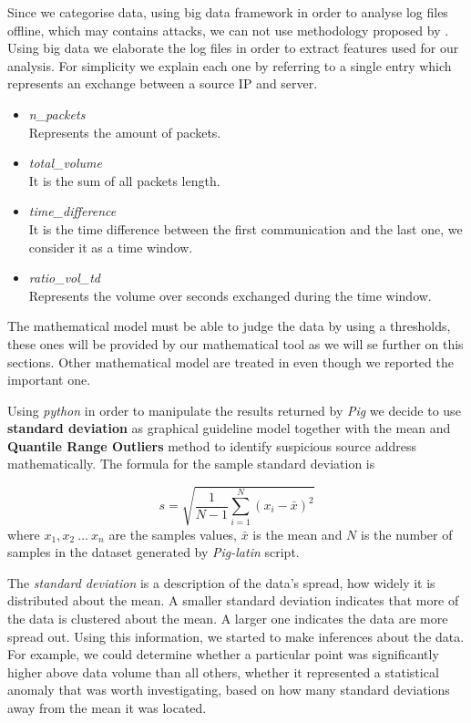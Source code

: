 Since we categorise data, using big data framework in order to analyse log files offline, which may contains attacks, we can not use methodology proposed by \cite{detection_by_path_analaysis}. Using big data we elaborate the log files in order to extract features used for our analysis. For simplicity we explain each one by referring to a single entry which represents an exchange between a source IP and server.

\begin{itemize}
	\item \textit{n\_packets} \\ Represents the amount of packets.
	\item \textit{total\_volume} \\ It is the sum of all packets length.
	\item \textit{time\_difference} \\ It is the time difference between the first communication and the last one, we consider it as a time window.
	\item \textit{ratio\_vol\_td} \\ Represents the volume over seconds exchanged during the time window.
\end{itemize}

The mathematical model must be able to judge the data by using a thresholds, these ones will be provided by our mathematical tool as we will se further on this sections. Other mathematical model are treated in  \cite{detection_by_path_analaysis} even though we reported the important one. 

Using \textit{python} in order to manipulate the results returned by \textit{Pig} we decide to use \textbf{standard deviation} as graphical guideline model together with the mean and  \textbf{Quantile Range Outliers} method to identify suspicious source address mathematically.
The formula for the sample standard deviation is

\begin{equation}
\label{eq:standard_dev}
	s = \sqrt{\frac{1}{N-1}\sum_{i=1}^N(x_i - \bar{x})^2}
\end{equation}
where $x_1, x_2\ ...\ x_n$ are the samples values, $\bar{x}$ is the mean and $N$ is the number of samples in the dataset generated by \textit{Pig-latin} script.

The \textit{standard deviation} is a description of the data's spread, how widely it is distributed about the mean.  
A smaller standard deviation indicates that more of the data is clustered about the mean.  
A larger one indicates the data are more spread out.
Using this information, we started to make inferences about the data.  
For example, we could determine whether a particular point was significantly higher above data volume than all others,  whether it represented a statistical anomaly that was worth investigating, based on how many standard deviations away from the mean it was located.

